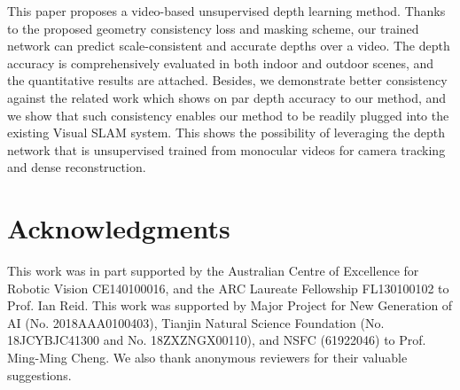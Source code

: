 \documentclass[twocolumn]{svjour3}
\begin{document}
This paper proposes a video-based unsupervised depth learning method.
Thanks to the proposed geometry consistency loss and masking scheme,
our trained network can predict scale-consistent and accurate depths over a video.
The depth accuracy is comprehensively evaluated in both indoor and outdoor scenes,
and the quantitative results are attached.
Besides, we demonstrate better consistency against the related work which shows on par depth accuracy to our method,
and we show that such consistency enables our method to be readily plugged into the existing Visual SLAM system.
This shows the possibility of leveraging the depth network that is unsupervised trained from monocular videos for camera tracking and dense reconstruction. 


\section*{Acknowledgments}
This work was in part  supported by the Australian Centre of Excellence for Robotic Vision CE140100016, 
and the ARC Laureate Fellowship FL130100102 to Prof. Ian Reid. 
This work was supported by Major Project for New Generation of AI (No. 2018AAA0100403),
Tianjin Natural Science Foundation (No. 18JCYBJC41300 and No. 18ZXZNGX00110), and NSFC (61922046) to Prof. Ming-Ming Cheng.
We also thank anonymous reviewers for their valuable suggestions.





{\footnotesize}
\end{document}

